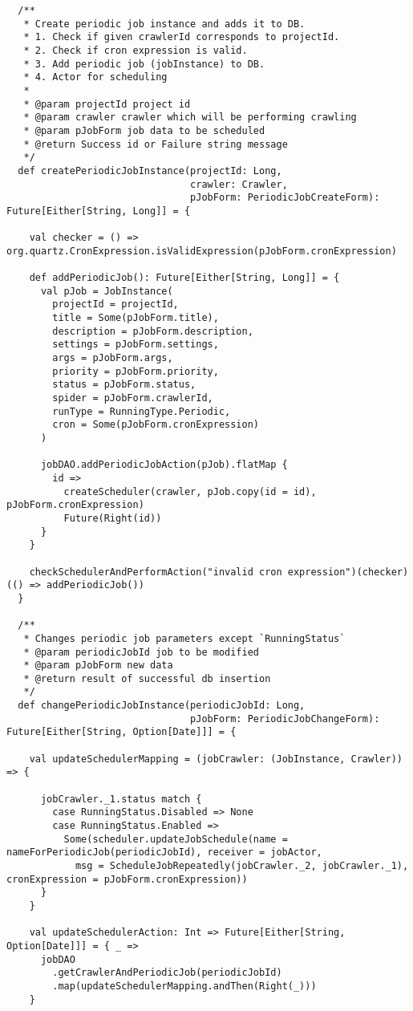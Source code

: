 \begin{lstlisting}
  /**
   * Create periodic job instance and adds it to DB.
   * 1. Check if given crawlerId corresponds to projectId.
   * 2. Check if cron expression is valid.
   * 3. Add periodic job (jobInstance) to DB.
   * 4. Actor for scheduling
   *
   * @param projectId project id
   * @param crawler crawler which will be performing crawling
   * @param pJobForm job data to be scheduled
   * @return Success id or Failure string message
   */
  def createPeriodicJobInstance(projectId: Long,
                                crawler: Crawler,
                                pJobForm: PeriodicJobCreateForm): Future[Either[String, Long]] = {

    val checker = () => org.quartz.CronExpression.isValidExpression(pJobForm.cronExpression)

    def addPeriodicJob(): Future[Either[String, Long]] = {
      val pJob = JobInstance(
        projectId = projectId,
        title = Some(pJobForm.title),
        description = pJobForm.description,
        settings = pJobForm.settings,
        args = pJobForm.args,
        priority = pJobForm.priority,
        status = pJobForm.status,
        spider = pJobForm.crawlerId,
        runType = RunningType.Periodic,
        cron = Some(pJobForm.cronExpression)
      )

      jobDAO.addPeriodicJobAction(pJob).flatMap {
        id =>
          createScheduler(crawler, pJob.copy(id = id), pJobForm.cronExpression)
          Future(Right(id))
      }
    }

    checkSchedulerAndPerformAction("invalid cron expression")(checker)(() => addPeriodicJob())
  }

  /**
   * Changes periodic job parameters except `RunningStatus`
   * @param periodicJobId job to be modified
   * @param pJobForm new data
   * @return result of successful db insertion
   */
  def changePeriodicJobInstance(periodicJobId: Long,
                                pJobForm: PeriodicJobChangeForm): Future[Either[String, Option[Date]]] = {

    val updateSchedulerMapping = (jobCrawler: (JobInstance, Crawler)) => {

      jobCrawler._1.status match {
        case RunningStatus.Disabled => None
        case RunningStatus.Enabled =>
          Some(scheduler.updateJobSchedule(name = nameForPeriodicJob(periodicJobId), receiver = jobActor,
            msg = ScheduleJobRepeatedly(jobCrawler._2, jobCrawler._1), cronExpression = pJobForm.cronExpression))
      }
    }

    val updateSchedulerAction: Int => Future[Either[String, Option[Date]]] = { _ =>
      jobDAO
        .getCrawlerAndPeriodicJob(periodicJobId)
        .map(updateSchedulerMapping.andThen(Right(_)))
    }


\end{lstlisting}
